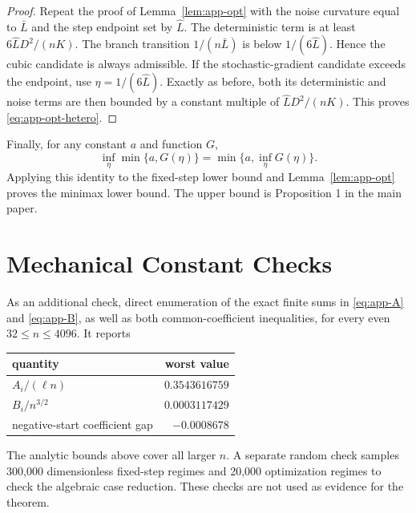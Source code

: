 \documentclass[twoside]{article}
\begin{document}
\begin{proof}
Repeat the proof of Lemma~\ref{lem:app-opt} with the noise curvature equal to
$\bar L$ and the step endpoint set by $\widehat L$. The deterministic term is
at least $6\widehat LD^2/(nK)$. The branch transition
$1/(n\bar L)$ is below $1/(6\widehat L)$. Hence the cubic candidate is always
admissible. If the stochastic-gradient candidate exceeds the endpoint, use
$\eta=1/(6\widehat L)$. Exactly as before, both its deterministic and noise
terms are then bounded by a constant multiple of
$\widehat LD^2/(nK)$. This proves \eqref{eq:app-opt-hetero}.
\end{proof}

Finally, for any constant $a$ and function $G$,
\begin{equation}
 \inf_\eta\min\{a,G(\eta)\}=\min\{a,\inf_\eta G(\eta)\}.
\end{equation}
Applying this identity to the fixed-step lower bound and
Lemma~\ref{lem:app-opt} proves the minimax lower bound. The upper bound is
Proposition 1 in the main paper.

\section{Mechanical Constant Checks}
\label{app:checks}

As an additional check, direct enumeration of the exact finite sums in
\eqref{eq:app-A} and \eqref{eq:app-B}, as well
as both common-coefficient inequalities, for every even
$32\le n\le4096$. It reports
\begin{center}
\begin{tabular}{lr}
\toprule
quantity & worst value \\
\midrule
$A_i/(\ell n)$ & $0.3543616759$ \\
$B_i/n^{3/2}$ & $0.0003117429$ \\
negative-start coefficient gap & $-0.0008678$ \\
\bottomrule
\end{tabular}
\end{center}
The analytic bounds above cover all larger $n$. A separate random check samples
300,000 dimensionless fixed-step regimes and 20,000 optimization regimes to
check the algebraic case reduction. These checks are not used as evidence for
the theorem.


\end{document}
